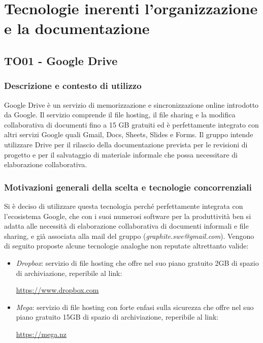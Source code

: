 \documentclass[./../Technology Baseline.tex]{subfiles}
\begin{document}
\section{Tecnologie inerenti l'organizzazione e la documentazione}

\subsection{TO01 - Google Drive}

\subsubsection{Descrizione e contesto di utilizzo}
Google Drive è un servizio di memorizzazione e sincronizzazione online introdotto da Google. Il servizio comprende il file hosting, il file sharing e la modifica collaborativa di documenti fino a 15 GB gratuiti ed è perfettamente integrato con altri servizi Google quali Gmail, Docs, Sheets, Slides e Forms. Il gruppo intende utilizzare Drive per il rilascio della documentazione prevista per le revisioni di progetto e per il salvataggio di materiale informale che possa necessitare di elaborazione collaborativa.

\subsubsection{Motivazioni generali della scelta e tecnologie concorrenziali}
Si è deciso di utilizzare questa tecnologia perché perfettamente integrata con l'ecosistema Google, che con i suoi numerosi software per la produttività ben si adatta alle necessità di elaborazione collaborativa di documenti informali e file sharing, e già associata alla mail del gruppo (\textit{graphite.swe@gmail.com}). Vengono di seguito proposte alcune tecnologie analoghe non reputate altrettanto valide:

\begin{itemize}
	\item \textit{Dropbox}: servizio di file hosting che offre nel suo piano gratuito 2GB di spazio di archiviazione, reperibile al link:
	\begin{center}
		\url{https://www.dropbox.com}
	\end{center}

	\item \textit{Mega}: servizio di file hosting con forte enfasi sulla sicurezza che offre nel suo piano gratuito 15GB di spazio di archiviazione, reperibile al link:
	\begin{center}
		\url{https://mega.nz}
	\end{center}
\end{itemize}
\end{document}
